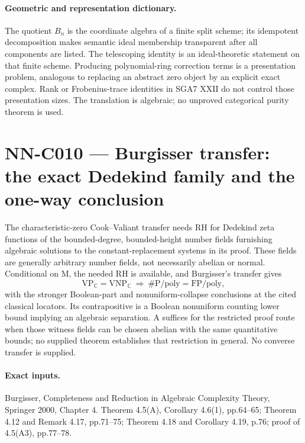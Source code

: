 \paragraph{Geometric and representation dictionary.}
The quotient $B_n$ is the coordinate algebra of a finite split scheme; its idempotent decomposition makes semantic ideal membership transparent after all components are listed. The telescoping identity is an ideal-theoretic statement on that finite scheme. Producing polynomial-ring correction terms is a presentation problem, analogous to replacing an abstract zero object by an explicit exact complex. Rank or Frobenius-trace identities in SGA7 XXII do not control those presentation sizes. The translation is algebraic; no unproved categorical purity theorem is used.



\section{NN-C010 --- Burgisser transfer: the exact Dedekind family and the one-way conclusion}
\begin{proposition}[NN-C010]
The characteristic-zero Cook--Valiant transfer needs RH for Dedekind zeta functions of the bounded-degree, bounded-height number fields furnishing algebraic solutions to the constant-replacement systems in its proof. These fields are generally arbitrary number fields, not necessarily abelian or normal. Conditional on M, the needed RH is available, and Burgisser's transfer gives
\[
 \mathrm{VP}_{\mathbb C}=\mathrm{VNP}_{\mathbb C}
 \ \Longrightarrow\ \#\mathrm P/\mathrm{poly}=\mathrm{FP}/\mathrm{poly},
\]
with the stronger Boolean-part and nonuniform-collapse conclusions at the cited classical locators. Its contrapositive is a Boolean nonuniform counting lower bound implying an algebraic separation. A suffices for the restricted proof route when those witness fields can be chosen abelian with the same quantitative bounds; no supplied theorem establishes that restriction in general. No converse transfer is supplied.
\end{proposition}
\paragraph{Exact inputs.}
Burgisser, Completeness and Reduction in Algebraic Complexity Theory, Springer 2000, Chapter 4. Theorem 4.5(A), Corollary 4.6(1), pp.64--65; Theorem 4.12 and Remark 4.17, pp.71--75; Theorem 4.18 and Corollary 4.19, p.76; proof of 4.5(A3), pp.77--78.

